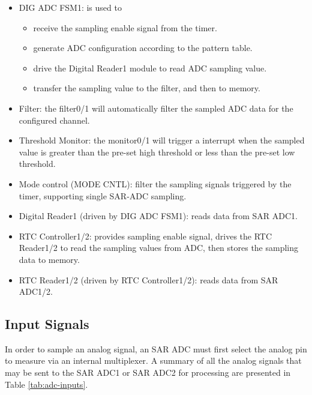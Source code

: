 \documentclass[main\_\_EN.tex]{subfiles}
\begin{document}
\begin{itemize}
    \item DIG ADC FSM1: is used to
    \begin{itemize}
        \item receive the sampling enable signal from the timer.
        \item generate ADC configuration according to the pattern table.
        \item drive the Digital Reader1 module to read ADC sampling value.
        \item transfer the sampling value to the filter, and then to memory.
    \end{itemize}
    \item Filter: the filter0/1 will automatically filter the sampled ADC data for the configured channel.
    \item Threshold Monitor: the monitor0/1 will trigger a interrupt when the sampled value is greater than the pre-set high threshold or less than the pre-set low threshold.
    \item Mode control (MODE CNTL): filter the sampling signals triggered by the timer, supporting single SAR-ADC sampling.
    \item \label{block:digital-reader0} Digital Reader1 (driven by DIG ADC FSM1): reads data from SAR ADC1.
    \item RTC Controller1/2: provides sampling enable signal, drives the RTC Reader1/2 to read the sampling values from ADC, then stores the sampling data to memory.
    \item RTC Reader1/2 (driven by RTC Controller1/2): reads data from SAR ADC1/2.
\end{itemize}

\subsection{Input Signals}

In order to sample an analog signal, an SAR ADC must first select the analog pin to measure via an internal multiplexer. A summary of all the analog signals that may be sent to the SAR ADC1 or SAR ADC2 for processing are presented in Table \ref{tab:adc-inputs}.
\end{document}
